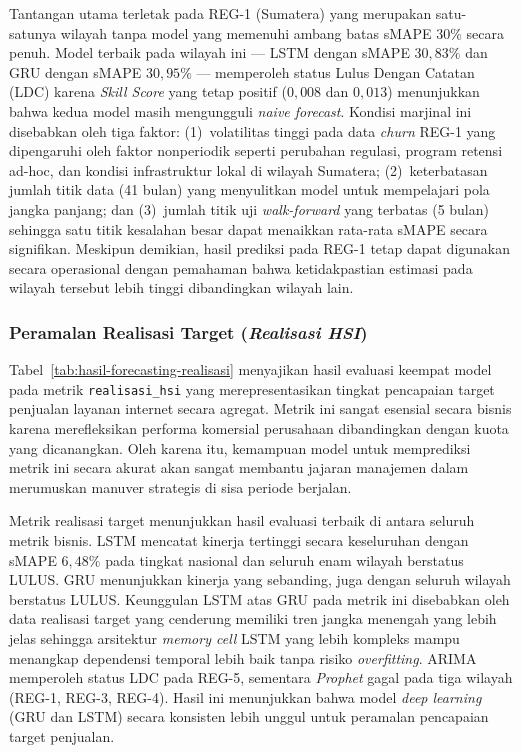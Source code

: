 Tantangan utama terletak pada REG-1 (Sumatera) yang merupakan satu-satunya wilayah tanpa model yang memenuhi ambang batas sMAPE $30\%$ secara penuh. Model terbaik pada wilayah ini --- LSTM dengan sMAPE $30{,}83\%$ dan GRU dengan sMAPE $30{,}95\%$ --- memperoleh status Lulus Dengan Catatan (LDC) karena \textit{Skill Score} yang tetap positif ($0{,}008$ dan $0{,}013$) menunjukkan bahwa kedua model masih mengungguli \textit{naive forecast}. Kondisi marjinal ini disebabkan oleh tiga faktor: (1)~volatilitas tinggi pada data \textit{churn} REG-1 yang dipengaruhi oleh faktor nonperiodik seperti perubahan regulasi, program retensi ad-hoc, dan kondisi infrastruktur lokal di wilayah Sumatera; (2)~keterbatasan jumlah titik data (41 bulan) yang menyulitkan model untuk mempelajari pola jangka panjang; dan (3)~jumlah titik uji \textit{walk-forward} yang terbatas (5 bulan) sehingga satu titik kesalahan besar dapat menaikkan rata-rata sMAPE secara signifikan. Meskipun demikian, hasil prediksi pada REG-1 tetap dapat digunakan secara operasional dengan pemahaman bahwa ketidakpastian estimasi pada wilayah tersebut lebih tinggi dibandingkan wilayah lain.

\subsubsection{Peramalan Realisasi Target (\textit{Realisasi HSI})}

Tabel~\ref{tab:hasil-forecasting-realisasi} menyajikan hasil evaluasi keempat model pada metrik \texttt{realisasi\_}\allowbreak\texttt{hsi} yang merepresentasikan tingkat pencapaian target penjualan layanan internet secara agregat. Metrik ini sangat esensial secara bisnis karena merefleksikan performa komersial perusahaan dibandingkan dengan kuota yang dicanangkan. Oleh karena itu, kemampuan model untuk memprediksi metrik ini secara akurat akan sangat membantu jajaran manajemen dalam merumuskan manuver strategis di sisa periode berjalan.



Metrik realisasi target menunjukkan hasil evaluasi terbaik di antara seluruh metrik bisnis. LSTM mencatat kinerja tertinggi secara keseluruhan dengan sMAPE $6{,}48\%$ pada tingkat nasional dan seluruh enam wilayah berstatus LULUS. GRU menunjukkan kinerja yang sebanding, juga dengan seluruh wilayah berstatus LULUS. Keunggulan LSTM atas GRU pada metrik ini disebabkan oleh data realisasi target yang cenderung memiliki tren jangka menengah yang lebih jelas sehingga arsitektur \textit{memory cell} LSTM yang lebih kompleks mampu menangkap dependensi temporal lebih baik tanpa risiko \textit{overfitting}. ARIMA memperoleh status LDC pada REG-5, sementara \textit{Prophet} gagal pada tiga wilayah (REG-1, REG-3, REG-4). Hasil ini menunjukkan bahwa model \textit{deep learning} (GRU dan LSTM) secara konsisten lebih unggul untuk peramalan pencapaian target penjualan.

